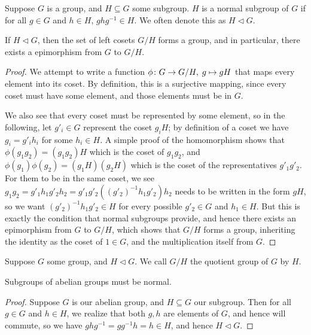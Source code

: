 \begin{definition}
    Suppose \(G\) is a group, and \(H \subseteq G\) some subgroup.
    \(H\) is a normal subgroup of \(G\)
    if for all \(g \in G\) and \(h \in H\),
    \(ghg^{-1} \in H\).
    We often denote this as \(H \lhd G\).
\end{definition}
\begin{theorem}
    If \(H \lhd G\),
    then the set of left cosets \(G/H\) forms a group,
    and in particular, there exists a epimorphism
    from \(G\) to \(G/H\).
\end{theorem}
\begin{proof}
    We attempt to write a function \(\phi\colon G\to G/H,\;g\mapsto gH\)
    that maps every element into its coset.
    By definition, this is a surjective mapping,
    since every coset must have some element,
    and those elements must be in \(G\).

    We also see that every coset must be represented by some element,
    so in the following, let \(g'_i \in G\) represent the coset \(g_i H\);
    by definition of a coset we have \(g_i = g'_i h_i\) for some \(h_i \in H\).
    A simple proof of the homomorphism shows that
    \(\phi(g_1g_2) = (g_1 g_2)H\) which is the coset of \(g_1 g_2\),
    and \(\phi(g_1)\phi(g_2) = (g_1 H)(g_2 H)\)
    which is the coset of the representatives \(g'_1 g'_2\).
    For them to be in the same coset,
    we see \(g_1 g_2 = g'_1 h_1 g'_2 h_2
    = g'_1 g'_2 ({(g'_2)}^{-1} h_1 g'_2) h_2\)
    needs to be written in the form \(gH\),
    so we want \({(g'_2)}^{-1} h_1 g'_2 \in H\)
    for every possible \(g'_2 \in G\) and \(h_1 \in H\).
    But this is exactly the condition that normal subgroups provide,
    and hence there exists an epimorphism from \(G\) to \(G/H\),
    which shows that \(G/H\) forms a group,
    inheriting the identity as the coset of \(1 \in G\),
    and the multiplication itself from \(G\).
\end{proof}
\begin{definition}
    Suppose \(G\) some group, and \(H \lhd G\).
    We call \(G/H\) the quotient group of \(G\) by \(H\).
\end{definition}

\begin{proposition}\label{prop:abelian-subgroup-normal}
    Subgroups of abelian groups must be normal.
\end{proposition}
\begin{proof}
    Suppose \(G\) is our abelian group,
    and \(H \subseteq G\) our subgroup.
    Then for all \(g \in G\) and \(h \in H\),
    we realize that both \(g,h\) are elements of \(G\),
    and hence will commute,
    so we have \(ghg^{-1} = gg^{-1}h = h \in H\),
    and hence \(H \lhd G\).
\end{proof}

